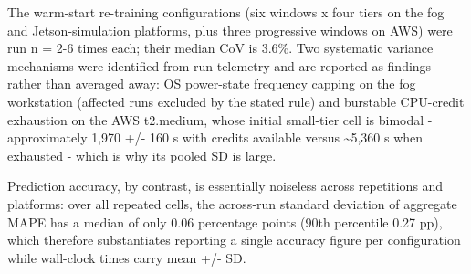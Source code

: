 \documentclass[
  10pt, ]{article}
\begin{document}
The warm-start re-training configurations (six windows x four tiers on the fog and Jetson-simulation platforms, plus three progressive windows on AWS) were run n = 2-6 times each; their median CoV is 3.6\%. Two systematic variance mechanisms were identified from run telemetry and are reported as findings rather than averaged away: OS power-state frequency capping on the fog workstation (affected runs excluded by the stated rule) and burstable CPU-credit exhaustion on the AWS t2.medium, whose initial small-tier cell is bimodal - approximately 1,970 +/- 160 s with credits available versus \textasciitilde5,360 s when exhausted - which is why its pooled SD is large.

Prediction accuracy, by contrast, is essentially noiseless across repetitions and platforms: over all repeated cells, the across-run standard deviation of aggregate MAPE has a median of only 0.06 percentage points (90th percentile 0.27 pp), which therefore substantiates reporting a single accuracy figure per configuration while wall-clock times carry mean +/- SD.
\end{document}
